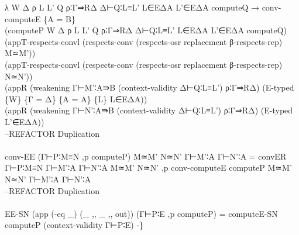 {\begin{code}
{\>  λ W Δ ρ L L' Q ρ∶Γ⇒RΔ Δ⊢Q∶L≡L' L∈EΔA L'∈EΔA computeQ → conv-computeE \{A = B\} \<\\
\>  (computeP W Δ ρ L L' Q ρ∶Γ⇒RΔ Δ⊢Q∶L≡L' L∈EΔA L'∈EΔA computeQ) \<\\
\>  (appT-respects-convl (respects-conv (respects-osr replacement β-respects-rep) M≃M')) \<\\
\>  (appT-respects-convl (respects-conv (respects-osr replacement β-respects-rep) N≃N')) \<\\
\>  (appR (weakening Γ⊢M'∶A⇛B (context-validity Δ⊢Q∶L≡L') ρ∶Γ⇒RΔ) (E-typed \{W\} \{Γ = Δ\} \{A = A\} \{L\} L∈EΔA)) \<\\
\>  (appR (weakening Γ⊢N'∶A⇛B (context-validity Δ⊢Q∶L≡L') ρ∶Γ⇒RΔ) (E-typed L'∈EΔA)) \<\\
\>--REFACTOR Duplication\<\\
\>\<\\
\>conv-EE (Γ⊢P∶M≡N ,p computeP) M≃M' N≃N' Γ⊢M'∶A Γ⊢N'∶A = convER Γ⊢P∶M≡N Γ⊢M'∶A Γ⊢N'∶A M≃M' N≃N' ,p conv-computeE computeP M≃M' N≃N' Γ⊢M'∶A Γ⊢N'∶A\<\\
\>--REFACTOR Duplication                      \<\\
\>                 \<\\
\>EE-SN (app (-eq \_) (\_ ,, \_ ,, out)) (Γ⊢P∶E ,p computeP) = computeE-SN computeP (context-validity Γ⊢P∶E) -\}}\<%
\end{code}
}
